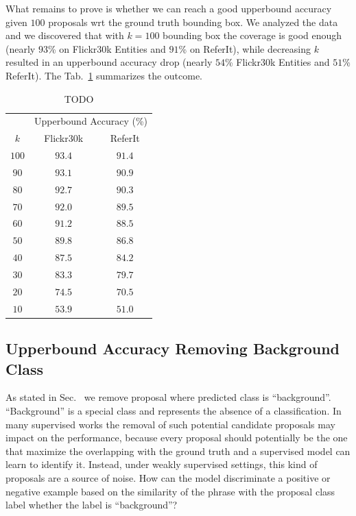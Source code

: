 What remains to prove is whether we can reach a good upperbound
accuracy given $100$ proposals wrt the ground truth bounding box. We
analyzed the data and we discovered that with $k = 100$ bounding box
the coverage is good enough (nearly $93$\% on Flickr30k Entities and
$91$\% on ReferIt), while decreasing $k$ resulted in an upperbound
accuracy drop (nearly $54$\% Flickr30k Entities and $51$\% ReferIt).
The Tab.~\ref{tab:bb-coverage} summarizes the outcome.

\begin{table}
  \centering
  \begin{tabular}{c|cc}
     & \multicolumn{2}{c}{Upperbound Accuracy (\%)} \\
    $k$ & Flickr30k & ReferIt \\\hline 
    $100$ & $93.4$ & $91.4$ \\ 
     $90$ & $93.1$ & $90.9$ \\  
     $80$ & $92.7$ & $90.3$ \\
     $70$ & $92.0$ & $89.5$ \\
     $60$ & $91.2$ & $88.5$ \\
     $50$ & $89.8$ & $86.8$ \\
     $40$ & $87.5$ & $84.2$ \\
     $30$ & $83.3$ & $79.7$ \\
     $20$ & $74.5$ & $70.5$ \\
     $10$ & $53.9$ & $51.0$ \\\hline
  \end{tabular}
  \caption[TODO]{TODO}
  \label{tab:bb-coverage}
\end{table}

\subsection{Upperbound Accuracy Removing Background Class}

As stated in Sec.~\cite{sec:impl-details} we remove proposal where
predicted class is ``background''. ``Background'' is a special class
and represents the absence of a classification. In many supervised
works the removal of such potential candidate proposals may impact on
the performance, because every proposal should potentially be the one
that maximize the overlapping with the ground truth and a supervised
model can learn to identify it. Instead, under weakly supervised
settings, this kind of proposals are a source of noise. How can the
model discriminate a positive or negative example based on the
similarity of the phrase with the proposal class label whether the
label is ``background''?

